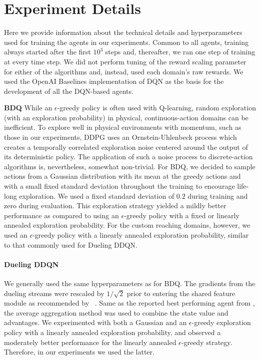 \documentclass[letterpaper]{article}
\newcommand{\citet}[1]
{\citeauthor{#1}~\shortcite{#1}}
\newcommand{\citep}{\cite}
\begin{document}
\section{Experiment Details}
\label{sec:exp_details}

Here we provide information about the technical details and hyperparameters used for training the agents in our experiments. Common to all agents, training always started after the first $10^3$ steps and, thereafter, we ran one step of training at every time step. We did not perform tuning of the reward scaling parameter for either of the algorithms and, instead, used each domain's raw rewards. We used the OpenAI Baselines \citep{baselines} implementation of DQN as the basis for the development of all the DQN-based agents.

\textbf{BDQ} 
While an $\epsilon$-greedy policy is often used with Q-learning, random exploration (with an exploration probability) in physical, continuous-action domains can be inefficient. To explore well in physical environments with momentum, such as those in our experiments, DDPG uses an Ornstein-Uhlenbeck process \citep{Uhlenbeck:1930theory} which creates a temporally correlated exploration noise centered around the output of its deterministic policy. The application of such a noise process to discrete-action algorithms is, nevertheless, somewhat non-trivial. For BDQ, we decided to sample actions from a Gaussian distribution with its mean at the greedy actions and with a small fixed standard deviation throughout the training to encourage life-long exploration. We used a fixed standard deviation of $0.2$ during training and zero during evaluation. This exploration strategy yielded a mildly better performance as compared to using an $\epsilon$-greedy policy with a fixed or linearly annealed exploration probability. For the custom reaching domains, however, we used an $\epsilon$-greedy policy with a linearly annealed exploration probability, similar to that commonly used for Dueling DDQN.

\paragraph{Dueling DDQN} We generally used the same hyperparameters as for BDQ. The gradients from the dueling streams were rescaled by $1/\sqrt{2}$ prior to entering the shared feature module as recommended by \citet{Wang:2016}. Same as the reported best performing agent from \citep{Wang:2016}, the average aggregation method was used to combine the state value and advantages. We experimented with both a Gaussian and an $\epsilon$-greedy exploration policy with a linearly annealed exploration probability, and observed a moderately better performance for the linearly annealed $\epsilon$-greedy strategy. Therefore, in our experiments we used the latter.
\end{document}
